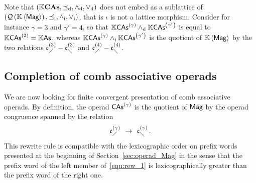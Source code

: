 Note that $\LatKCAs$ does not embed as a sublattice of $\LatQMag$, that
is $\iota$ is not a lattice morphism. Consider for instance $\gamma = 3$
and $\gamma' = 4$, so that $\KCAs{\gamma} \InfCAs \KCAs{\gamma'}$ is
equal to $\KCAs{2} = \K\As$, whereas
$\KCAs{\gamma} \InfQMag \KCAs{\gamma'}$ is the quotient of $\KMag$ by the
two relations $\LComb{3} - \RComb{3}$ and $\LComb{4} - \RComb{4}$.
\medbreak

\subsection{Completion of comb associative operads}
We are now looking for finite convergent presentation of comb associative
 operads.
By definition, the operad $\CAs{\gamma}$ is the quotient of $\Mag$ by the 
operad congruence spanned by the relation
\begin{equation} \label{equ:rew_1}
    \LComb{\gamma}
    \enspace \Rew \enspace
    \RComb{\gamma}\,.
\end{equation}
This rewrite rule is compatible with the lexicographic order on prefix
words presented at the beginning of Section~\ref{sec:operad_Mag} in the
sense that the prefix word of the left member of~\eqref{equ:rew_1} is
lexicographically greater than the prefix word of the right one.
\medbreak

